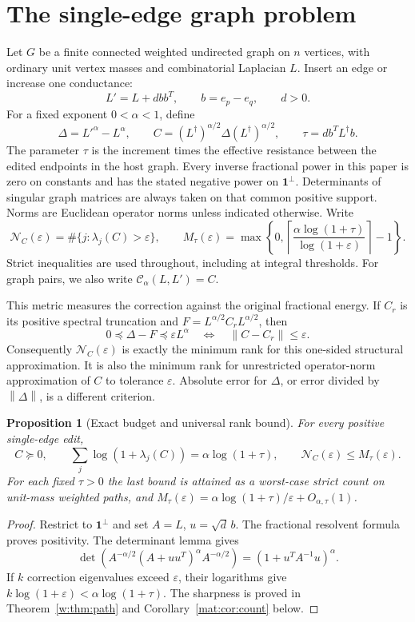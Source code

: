 \documentclass[11pt]{article}
\newtheorem{proposition}[theorem]{Proposition}
\newcommand{\norm}[1]{\left\lVert#1\right\rVert}
\begin{document}
\section{The single-edge graph problem}\label{sec:introduction}
Let $G$ be a finite connected weighted undirected graph on $n$ vertices,
with ordinary unit vertex masses and combinatorial Laplacian $L$.
Insert an edge or increase one conductance:
\[
 L'=L+d b b^T,\qquad b=e_p-e_q,\qquad d>0.
\]
For a fixed exponent $0<\alpha<1$, define
\begin{equation}\label{eq:graph-response}
 \Delta=L'^\alpha-L^\alpha,\qquad
 C=(L^\dagger)^{\alpha/2}\Delta(L^\dagger)^{\alpha/2},\qquad
 \tau=d b^TL^\dagger b.
\end{equation}
The parameter $\tau$ is the increment times the effective resistance
between the edited endpoints in the host graph. Every inverse fractional
power in this paper is zero on constants and has the stated negative
power on $\mathbf1^\perp$. Determinants of singular graph matrices are
always taken on that common positive support. Norms are Euclidean
operator norms unless indicated otherwise. Write
\[
 \mathcal N_C(\varepsilon)=\#\{j:\lambda_j(C)>\varepsilon\},\qquad
 M_\tau(\varepsilon)=\max\left\{0,
 \left\lceil\frac{\alpha\log(1+\tau)}{\log(1+\varepsilon)}\right\rceil-1
 \right\}.
\]
Strict inequalities are used throughout, including at integral thresholds.
For graph pairs, we also write $\mathcal C_\alpha(L,L')=C$.

This metric measures the correction against the original fractional
energy. If $C_r$ is its positive spectral truncation and
$F=L^{\alpha/2}C_rL^{\alpha/2}$, then
\begin{equation}\label{eq:one-sided-goal}
 0\preceq\Delta-F\preceq\varepsilon L^\alpha
 \quad\Longleftrightarrow\quad
 \norm{C-C_r}\le\varepsilon.
\end{equation}
Consequently $\mathcal N_C(\varepsilon)$ is exactly the minimum rank
for this one-sided structural approximation. It is also the minimum
rank for unrestricted operator-norm approximation of $C$ to tolerance
$\varepsilon$. Absolute error for $\Delta$, or error divided by
$\norm\Delta$, is a different criterion.

\begin{proposition}[Exact budget and universal rank bound]\label{prop:budget}
For every positive single-edge edit,
\[
 C\succeq0,\qquad
 \sum_j\log(1+\lambda_j(C))=\alpha\log(1+\tau),\qquad
 \mathcal N_C(\varepsilon)\le M_\tau(\varepsilon).
\]
For each fixed $\tau>0$ the last bound is attained as a worst-case
strict count on unit-mass weighted paths, and
$M_\tau(\varepsilon)=\alpha\log(1+\tau)/\varepsilon+O_{\alpha,\tau}(1)$.
\end{proposition}
\begin{proof}
Restrict to $\mathbf1^\perp$ and set $A=L$, $u=\sqrt d\,b$.
The fractional resolvent formula proves positivity. The determinant
lemma gives
\[
 \det(A^{-\alpha/2}(A+uu^T)^\alpha A^{-\alpha/2})
 =(1+u^TA^{-1}u)^\alpha.
\]
If $k$ correction eigenvalues exceed $\varepsilon$, their logarithms
give $k\log(1+\varepsilon)<\alpha\log(1+\tau)$.
The sharpness is proved in Theorem~\ref{w:thm:path} and
Corollary~\ref{mat:cor:count} below.
\end{proof}
\end{document}
